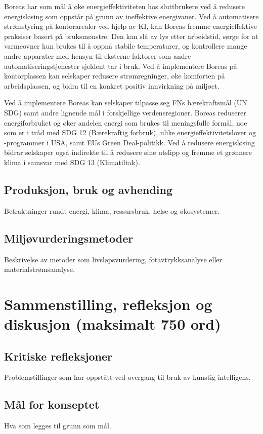 \documentclass{article}
\begin{document}
Boreas har som mål å øke energieffektiviteten hos sluttbrukere ved å redusere energisløsing som oppstår på grunn av ineffektive energivaner. Ved å automatisere strømstyring på kontorarealer ved hjelp av KI, kan Boreas fremme energieffektive praksiser basert på bruksmønstre. Den kan slå av lys etter arbeidstid, sørge for at varmeovner kun brukes til å oppnå stabile temperaturer, og kontrollere mange andre apparater med hensyn til eksterne faktorer som andre automatiseringstjenester sjeldent tar i bruk. Ved å implementere Boreas på kontorplassen kan selskaper redusere strømregninger, øke komforten på arbeidsplassen, og bidra til en konkret positiv innvirkning på miljøet.

Ved å implementere Boreas kan selskaper tilpasse seg FNs bærekraftsmål (UN SDG) samt andre lignende mål i forskjellige verdensregioner. Boreas reduserer energiforbruket og øker andelen energi som brukes til meningsfulle formål, noe som er i tråd med SDG 12 (Bærekraftig forbruk), ulike energieffektivitetslover og -programmer i USA, samt EUs Green Deal-politikk. Ved å redusere energisløsing bidrar selskaper også indirekte til å redusere sine utslipp og fremme et grønnere klima i samsvar med SDG 13 (Klimatiltak).

\subsection*{Produksjon, bruk og avhending}
Betraktninger rundt energi, klima, ressursbruk, helse og økosystemer.

\subsection*{Miljøvurderingsmetoder}
Beskrivelse av metoder som livsløpsvurdering, fotavtrykksanalyse eller materialstrømsanalyse.

\section{Sammenstilling, refleksjon og diskusjon (maksimalt 750 ord)}
\subsection*{Kritiske refleksjoner}
Problemstillinger som har oppstått ved overgang til bruk av kunstig intelligens.

\subsection*{Mål for konseptet}
Hva som legges til grunn som mål.
\end{document}
